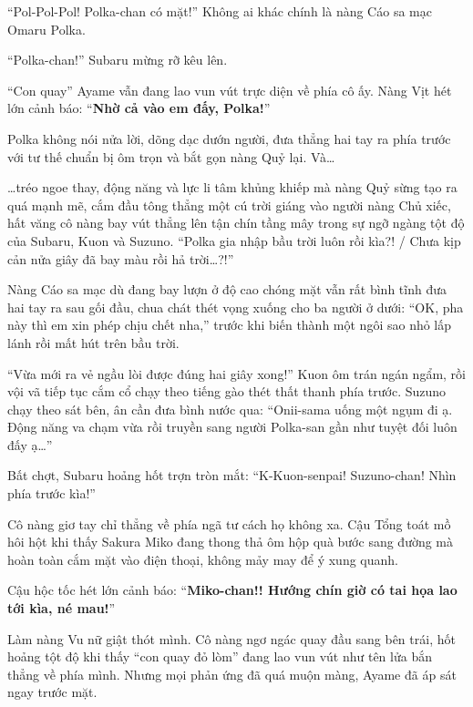 \documentclass[../main.tex]{subfiles}
\begin{document}
``Pol-Pol-Pol! Polka-chan có mặt!'' Không ai khác chính là nàng Cáo sa mạc Omaru Polka.


``Polka-chan!'' Subaru mừng rỡ kêu lên.

``Con quay'' Ayame vẫn đang lao vun vút trực diện về phía cô ấy. Nàng Vịt hét lớn cảnh báo: ``\textbf{Nhờ cả vào em đấy, Polka!}''

Polka không nói nửa lời, dõng dạc dướn người, đưa thẳng hai tay ra phía trước với tư thế chuẩn bị ôm trọn và bắt gọn nàng Quỷ lại. Và\dots

\dots tréo ngoe thay, động năng và lực li tâm khủng khiếp mà nàng Quỷ sừng tạo ra quá mạnh mẽ, cắm đầu tông thẳng một cú trời giáng vào người nàng Chủ xiếc, hất văng cô nàng bay vút thẳng lên tận chín tầng mây trong sự ngỡ ngàng tột độ của Subaru, Kuon và Suzuno. ``Polka gia nhập bầu trời luôn rồi kìa?! / Chưa kịp cản nửa giây đã bay màu rồi hả trời\dots?!''

Nàng Cáo sa mạc dù đang bay lượn ở độ cao chóng mặt vẫn rất bình tĩnh đưa hai tay ra sau gối đầu, chua chát thét vọng xuống cho ba người ở dưới: ``OK, pha này thì em xin phép chịu chết nha,'' trước khi biến thành một ngôi sao nhỏ lấp lánh rồi mất hút trên bầu trời.


``Vừa mới ra vẻ ngầu lòi được đúng hai giây xong!'' Kuon ôm trán ngán ngẩm, rồi vội vã tiếp tục cắm cổ chạy theo tiếng gào thét thất thanh phía trước. Suzuno chạy theo sát bên, ân cần đưa bình nước qua: ``Onii-sama uống một ngụm đi ạ. Động năng va chạm vừa rồi truyền sang người Polka-san gần như tuyệt đối luôn đấy ạ\dots''

Bất chợt, Subaru hoảng hốt trợn tròn mắt: ``K-Kuon-senpai! Suzuno-chan! Nhìn phía trước kìa!''

Cô nàng giơ tay chỉ thẳng về phía ngã tư cách họ không xa. Cậu Tổng toát mồ hôi hột khi thấy Sakura Miko đang thong thả ôm hộp quà bước sang đường mà hoàn toàn cắm mặt vào điện thoại, không mảy may để ý xung quanh.

Cậu hộc tốc hét lớn cảnh báo: ``\textbf{Miko-chan!! Hướng chín giờ có tai họa lao tới kìa, né mau!}''

Làm nàng Vu nữ giật thót mình. Cô nàng ngơ ngác quay đầu sang bên trái, hốt hoảng tột độ khi thấy ``con quay đỏ lòm'' đang lao vun vút như tên lửa bắn thẳng về phía mình. Nhưng mọi phản ứng đã quá muộn màng, Ayame đã áp sát ngay trước mặt.

\end{document}
